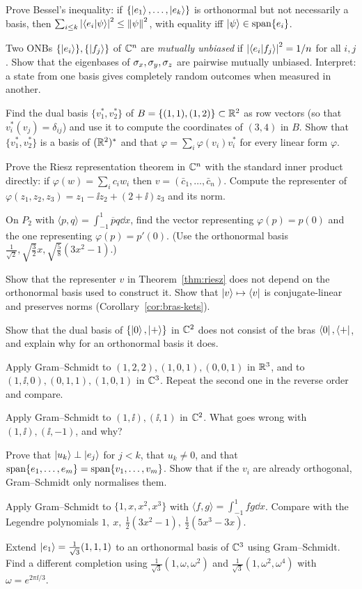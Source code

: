 \begin{exerciseset}
   Prove Bessel's inequality: if $\{\left|e_1\right\rangle,\dots,\left|e_k\right\rangle\}$ is orthonormal but not necessarily a basis, then $\sum_{i\le k}\left|\left\langle e_i\middle|\psi\right\rangle\right|^2\le\left\|\psi\right\|^2$, with equality iff $\left|\psi\right\rangle\in\operatorname{span}\{e_i\}$.

   Two ONBs $\{\left|e_i\right\rangle\},\{\left|f_j\right\rangle\}$ of $\mathbb{C}^n$ are \emph{mutually unbiased} if $\left|\left\langle e_i\middle|f_j\right\rangle\right|^2=1/n$ for all $i,j$. Show that the eigenbases of $\sigma_x,\sigma_y,\sigma_z$ are pairwise mutually unbiased. Interpret: a state from one basis gives completely random outcomes when measured in another.

   Find the dual basis $\{v_1^*,v_2^*\}$ of $B=\{(1,1),(1,2)\}\subset\mathbb{R}^2$ as row vectors (so that $v_i^*(v_j)=\delta_{ij}$) and use it to compute the coordinates of $(3,4)$ in $B$. Show that $\{v_1^*,v_2^*\}$ is a basis of $(\mathbb{R}^2)^*$ and that $\varphi=\sum_i\varphi(v_i)v_i^*$ for every linear form $\varphi$.

   Prove the Riesz representation theorem in $\mathbb{C}^n$ with the standard inner product directly: if $\varphi(w)=\sum_ic_iw_i$ then $v=(\bar c_1,\dots,\bar c_n)$. Compute the representer of $\varphi(z_1,z_2,z_3)=z_1-\ii z_2+(2+\ii)z_3$ and its norm.

   On $P_2$ with $\langle p,q\rangle=\int_{-1}^1\overline pq\dd x$, find the vector representing $\varphi(p)=p(0)$ and the one representing $\varphi(p)=p'(0)$. (Use the orthonormal basis $\frac1{\sqrt2},\sqrt{\tfrac32}x,\sqrt{\tfrac58}(3x^2-1)$.)

   Show that the representer $v$ in Theorem~\ref{thm:riesz} does not depend on the orthonormal basis used to construct it. Show that $\left|v\right\rangle\mapsto\left\langle v\right|$ is conjugate-linear and preserves norms (Corollary~\ref{cor:bras-kets}).

   Show that the dual basis of $\{\left|0\right\rangle,\left|+\right\rangle\}$ in $\mathbb{C}^2$ does not consist of the bras $\left\langle0\right|,\left\langle+\right|$, and explain why for an orthonormal basis it does.

   Apply Gram--Schmidt to $(1,2,2),(1,0,1),(0,0,1)$ in $\mathbb{R}^3$, and to $(1,\ii,0),(0,1,1),(1,0,1)$ in $\mathbb{C}^3$. Repeat the second one in the reverse order and compare.

   Apply Gram--Schmidt to $(1,\ii),(\ii,1)$ in $\mathbb{C}^2$. What goes wrong with $(1,\ii),(\ii,-1)$, and why?

   Prove that $\left|u_k\right\rangle\perp\left|e_j\right\rangle$ for $j<k$, that $u_k\neq0$, and that $\operatorname{span}\{e_1,\dots,e_m\}=\operatorname{span}\{v_1,\dots,v_m\}$. Show that if the $v_i$ are already orthogonal, Gram--Schmidt only normalises them.

   Apply Gram--Schmidt to $\{1,x,x^2,x^3\}$ with $\langle f,g\rangle=\int_{-1}^1fg\dd x$. Compare with the Legendre polynomials $1,\ x,\ \tfrac12(3x^2-1),\ \tfrac12(5x^3-3x)$.

   Extend $\left|e_1\right\rangle=\tfrac1{\sqrt3}(1,1,1)$ to an orthonormal basis of $\mathbb{C}^3$ using Gram--Schmidt. Find a different completion using $\tfrac1{\sqrt3}(1,\omega,\omega^2)$ and $\tfrac1{\sqrt3}(1,\omega^2,\omega^4)$ with $\omega=e^{2\pi\ii/3}$.
\end{exerciseset}
